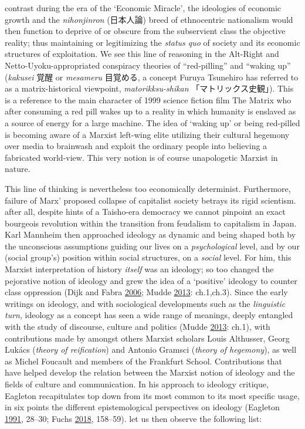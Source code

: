 \documentclass[10pt,british,A4paper,,openany]{memoir}
\begin{document}
contrast during the era of the `Economic Miracle', the ideologies of
economic growth and the \emph{nihonjinron} (日本人論) breed of
ethnocentric nationalism would then function to deprive of or obscure
from the subservient class the objective reality; thus maintaining or
legitimizing the \emph{status quo} of society and its economic
structures of exploitation. We see this line of reasoning in the
Alt-Right and Netto-Uyoku-appropriated conspiracy theories of
``red-pilling'' and ``waking up'' (\emph{kakusei} 覚醒 or
\emph{mesameru} 目覚める, a concept Furuya Tsunehiro has referred to as
a matrix-historical viewpoint, \emph{matorikksu-shikan}
「マトリックス史観」). This is a reference to the main character of 1999
science fiction film The Matrix who after consuming a red pill wakes up
to a reality in which humanity is enslaved as a source of energy for a
large machine. The idea of `waking up' or being red-pilled is becoming
aware of a Marxist left-wing elite utilizing their cultural hegemony
over media to brainwash and exploit the ordinary people into believing a
fabricated world-view. This very notion is of course unapologetic
Marxist in nature.

This line of thinking is nevertheless too economically determinist.
Furthermore, failure of Marx' proposed collapse of capitalist society
betrays its rigid scientism. after all, despite hints of a Taisho-era
democracy we cannot pinpoint an exact bourgeois revolution within the
transition from feudalism to capitalism in Japan. Karl Mannheim then
approached ideology as dynamic and being shaped both by the unconscious
assumptions guiding our lives on a \emph{psychological} level, and by
our (social group's) position within social structures, on a
\emph{social} level. For him, this Marxist interpretation of history
\emph{itself} was an ideology; so too changed the pejorative notion of
ideology and grew the idea of a `positive' ideology to counter class
oppression (Dijk and Fabra
\protect\hyperlink{ref-van_dijk_politics_2006}{2006}; Mudde
\protect\hyperlink{ref-mudde_oxford_2013}{2013}: ch.1,ch.3). Since the
early writings on ideology, and with sociological developments such as
the \emph{linguistic turn}, ideology as a concept has seen a wide range
of meanings, deeply entangled with the study of discourse, culture and
politics (Mudde \protect\hyperlink{ref-mudde_oxford_2013}{2013}: ch.1),
with contributions made by amongst others Marxist scholars Louis
Althusser, Georg Lukács (\emph{theory of reification}) and Antonio
Gramsci (\emph{theory of hegemony}), as well as Michel Foucault and
members of the Frankfurt School. Contributions that have helped develop
the relation between the Marxist notion of ideology and the fields of
culture and communication. In his approach to ideology critique,
Eagleton recapitulates top down from its most common to its most
specific usage, in six points the different epistemological perspectives
on ideology (Eagleton
\protect\hyperlink{ref-eagleton_ideology:_1991}{1991}, 28--30; Fuchs
\protect\hyperlink{ref-fuchs_racism_2018}{2018}, 158--59). let us then
observe the following list:
\end{document}
